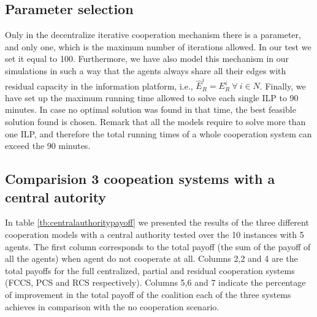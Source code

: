 \documentclass{article}
\begin{document}
\subsection{Parameter selection}

Only in the decentralize iterative cooperation mechanism there is a parameter, and only one, which is the maximum number of iterations allowed. In our test we set it equal to 100. Furthermore, we have also model this mechanism in our simulations in such a way that the agents always share all their edges with residual capacity in the information platform, i.e., $\widehat{E}_R^i=E_R^i\ \forall\ i\in N$. Finally, we have set up the maximum running time allowed to solve each single ILP to 90 minutes. In case no optimal solution was found in that time, the best feasible solution found is chosen. Remark that all the models require to solve more than one ILP, and therefore the total running times of a whole cooperation system can exceed the 90 minutes.

\subsection{Comparision 3 coopeation systems with a central autority}

In table \ref{tb:centralauthoritypayoff} we presented the results of the three different cooperation models with a central authority tested over the 10 instances with 5 agents. The first column corresponds to the total payoff (the sum of the payoff of all the agents) when agent do not cooperate at all. Columns 2,2 and 4 are the total payoffs for the full centralized, partial and residual cooperation systems (FCCS, PCS and RCS respectively). Columns 5,6 and 7 indicate the percentage of improvement in the total payoff of the coalition each of the three systems achieves in comparison with the no cooperation scenario.
\end{document}
